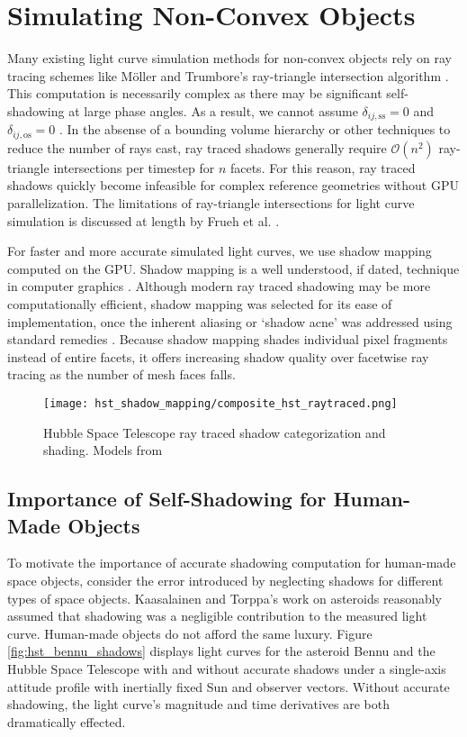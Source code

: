 \section{Simulating Non-Convex Objects}

Many existing light curve simulation methods for non-convex objects rely on ray tracing schemes like Möller and Trumbore's ray-triangle intersection algorithm \cite{moller2005,fan2020thesis}. This computation is necessarily complex as there may be significant self-shadowing at large phase angles. As a result, we cannot assume $\delta_{ij,\text{ss}} = 0$ and $\delta_{ij,\text{os}} = 0$ \cite{frueh2014,fan2020thesis}. In the absense of a bounding volume hierarchy or other techniques to reduce the number of rays cast, ray traced shadows generally require $\mathcal{O}(n^2)$ ray-triangle intersections per timestep for $n$ facets. For this reason, ray traced shadows quickly become infeasible for complex reference geometries without GPU parallelization. The limitations of ray-triangle intersections for light curve simulation is discussed at length by Frueh et al. \cite{frueh2014}.

For faster and more accurate simulated light curves, we use shadow mapping computed on the GPU. Shadow mapping is a well understood, if dated, technique in computer graphics \cite{kolivand2013}. Although modern ray traced shadowing may be more computationally efficient, shadow mapping was selected for its ease of implementation, once the inherent aliasing or `shadow acne' was addressed using standard remedies \cite{kolivand2013}. Because shadow mapping shades individual pixel fragments instead of entire facets, it offers increasing shadow quality over facetwise ray tracing as the number of mesh faces falls.

\graphicspath{{/Users/liamrobinson/Documents/msthesis/static_images/aas_2022_figs}}
\begin{figure}[!htb]
  \centering
  \texttt{[image: hst\_shadow\_mapping/composite\_hst\_raytraced.png]}
  \caption{Hubble Space Telescope ray traced shadow categorization and shading. Models from \cite{nasa_models}}
  \label{hst_shadows_ray}
\end{figure}

\subsection{Importance of Self-Shadowing for Human-Made Objects}

To motivate the importance of accurate shadowing computation for human-made space objects, consider the error introduced by neglecting shadows for different types of space objects. Kaasalainen and Torppa's work on asteroids reasonably assumed that shadowing was a negligible contribution to the measured light curve. Human-made objects do not afford the same luxury. Figure \ref{fig:hst_bennu_shadows} displays light curves for the asteroid Bennu and the Hubble Space Telescope with and without accurate shadows under a single-axis attitude profile with inertially fixed Sun and observer vectors. Without accurate shadowing, the light curve's magnitude and time derivatives are both dramatically effected.

